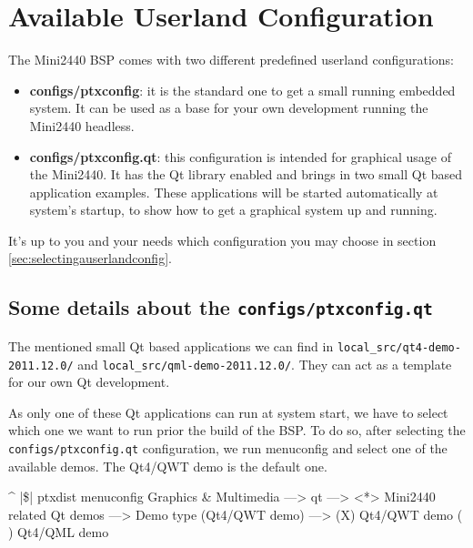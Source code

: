 
\section{Available Userland Configuration}	\label{sec:userland}

The Mini2440 BSP comes with two different predefined userland configurations:

\begin{itemize}
	\item \textbf{configs/ptxconfig}: it is the standard one to get a small
	running embedded system. It can be used as a base for your own
	development running the Mini2440 headless.
	\item \textbf{configs/ptxconfig.qt}: this configuration is intended for
	graphical usage of the Mini2440. It has the Qt library enabled and brings
	in two small Qt based application examples. These applications will be
	started automatically at system's startup, to show how to get a
	graphical system up and running.
\end{itemize}

It's up to you and your needs which configuration you may choose in section
\ref{sec:selectingauserlandconfig}.

\subsection{Some details about the \texttt{configs/ptxconfig.qt}}

The mentioned small Qt based applications we can find in
\texttt{local\_src/qt4-demo-2011.12.0/} and \texttt{local\_src/qml-demo-2011.12.0/}.
They can act as a template for our own Qt development.

As only one of these Qt applications can run at system start, we have to select
which one we want to run prior the build of the BSP. To do so, after selecting
the \texttt{configs/ptxconfig.qt} configuration, we run menuconfig and select
one of the available demos. The Qt4/QWT demo is the default one.

\begin{ptxshell}[escapechar=|]{^}
|\$| ptxdist menuconfig
  Graphics & Multimedia  --->
     qt --->
        <*> Mini2440 related Qt demos --->
           Demo type (Qt4/QWT demo) --->
              (X) Qt4/QWT demo
              ( ) Qt4/QML demo
\end{ptxshell}

